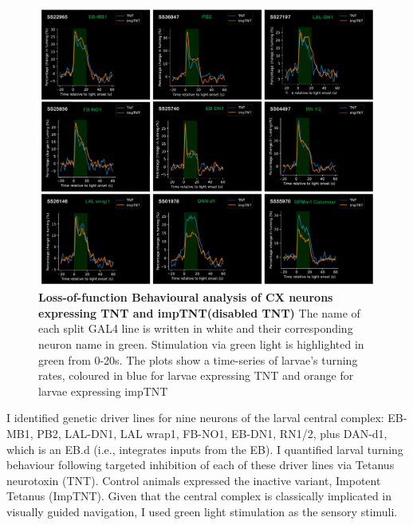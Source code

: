     \begin{figure}
        \centering
        \includegraphics[width=12cm]{Figs/CX/BehaviourAssays.pdf}
        \caption[Loss of Function Analysis during Light Stimulation]{\textbf{Loss-of-function Behavioural analysis of CX neurons expressing TNT and impTNT(disabled TNT)} The name of each split GAL4 line is written in white and their corresponding neuron name in green. Stimulation via green light is highlighted in green from 0-20s. The plots show a time-series of larvae's turning rates, coloured in blue for larvae expressing TNT and orange for larvae expressing impTNT}
        \label{LOS}
    \end{figure}

    I identified genetic driver lines for nine neurons of the larval central complex: EB-MB1, PB2, LAL-DN1, LAL wrap1, FB-NO1, EB-DN1, RN1/2, plus DAN-d1, which is an EB.d (i.e., integrates inputs from the EB). 
    I quantified larval turning behaviour following targeted inhibition of each of these driver lines via Tetanus neurotoxin (TNT).
    Control animals expressed the inactive variant, Impotent Tetanus (ImpTNT).
    Given that the central complex is classically implicated in visually guided navigation, I used green light stimulation as the sensory stimuli.

